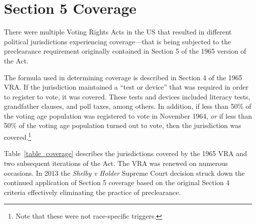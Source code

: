 \documentclass[12pt]{article}
\begin{document}
\section{Section 5 Coverage}\label{appendix_coverage}
\setcounter{table}{0}
\setcounter{figure}{0}
\renewcommand{\thetable}{B\arabic{table}}
\renewcommand{\thefigure}{B\arabic{figure}}
\normalsize

There were multiple Voting Rights Acts in the US that resulted in different political jurisdictions experiencing coverage---that is being subjected to the preclearance requirement originally contained in Section 5 of the 1965 version of the Act.

The formula used in determining coverage is described in Section 4 of the 1965 VRA.  If the jurisdiction maintained a ``test or device'' that was required in order to register to vote, it was covered.  These tests and devices included literacy tests, grandfather clauses, and poll taxes, among others.  In addition, if less than 50\% of the voting age population was registered to vote in November 1964, \emph{or} if less than 50\% of the voting age population turned out to vote, then the jurisdiction was covered.\footnote{Note that these were not race-specific triggers.}

Table~\ref{table_coverage} describes the jurisdictions covered by the 1965 VRA and two subsequent iterations of the Act.  The VRA was renewed on numerous occasions.  In 2013 the \emph{Shelby v Holder} Supreme Court decision struck down the continued application of Section 5 coverage based on the original Section 4 criteria effectively eliminating the practice of preclearance.
\end{document}
